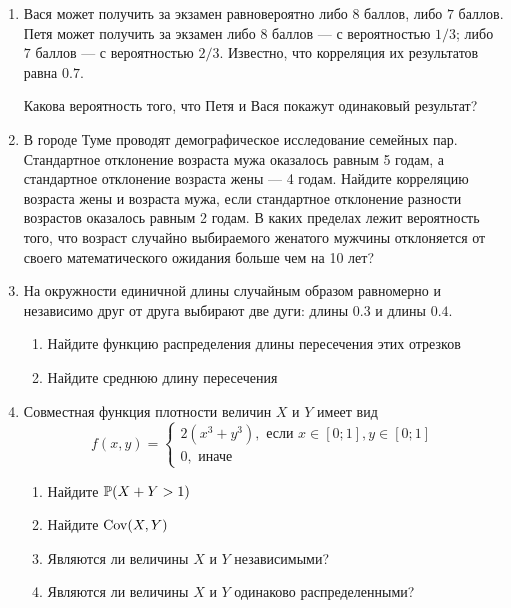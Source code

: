 \documentclass[12pt, a4paper]{article}\usepackage[]{graphicx}\usepackage[]{color}
\begin{document}
\begin{enumerate}
\item Вася может получить за экзамен равновероятно либо $8$ баллов, либо $7$ баллов. Петя может получить за экзамен либо $8$ баллов — с вероятностью $1/3$; либо $7$ баллов — с вероятностью $2/3$. Известно, что корреляция их результатов равна $0.7$.

Какова вероятность того, что Петя и Вася покажут одинаковый результат?

\item В  городе Туме проводят демографическое исследование семейных пар. Стандартное отклонение возраста мужа оказалось равным 5 годам, а стандартное отклонение возраста жены — 4 годам. Найдите корреляцию возраста жены и возраста мужа, если стандартное отклонение разности возрастов оказалось равным 2 годам. В каких пределах лежит вероятность того, что возраст случайно выбираемого женатого мужчины отклоняется от своего математического ожидания больше чем на 10 лет?


\item На окружности единичной длины случайным образом равномерно и независимо друг от друга выбирают две дуги: длины $0.3$ и длины $0.4$.
\begin{enumerate}
\item  Найдите функцию распределения длины пересечения этих отрезков
\item Найдите среднюю длину пересечения
\end{enumerate}


\item  Совместная функция плотности величин $X$ и $Y$ имеет вид
\begin{equation}
\nonumber
f(x,y)=\begin{cases}
2(x^3+y^3), \text{ если } x\in [0;1], y\in [0;1] \\
0, \mbox{ иначе}
\end{cases}
\end{equation}
\begin{enumerate}
\item Найдите $\P(X+Y>1)$
\item Найдите $\Cov(X,Y)$
\item Являются ли величины $X$ и $Y$ независимыми?
\item Являются ли величины $X$ и $Y$ одинаково распределенными?
\end{enumerate}




\end{enumerate}
\end{document}
